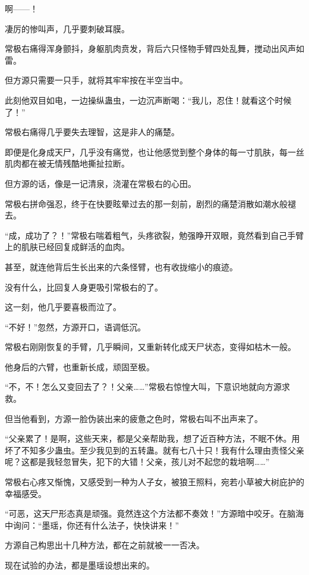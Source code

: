 
\begin{this_body}

啊——！

凄厉的惨叫声，几乎要刺破耳膜。

常极右痛得浑身颤抖，身躯肌肉贲发，背后六只怪物手臂四处乱舞，搅动出风声如雷。

但方源只需要一只手，就将其牢牢按在半空当中。

此刻他双目如电，一边操纵蛊虫，一边沉声断喝：“我儿，忍住！就看这个时候了！”

常极右痛得几乎要失去理智，这是非人的痛楚。

即便是化身成天尸，几乎没有痛觉，也让他感觉到整个身体的每一寸肌肤，每一丝肌肉都在被无情残酷地撕扯拉断。

但方源的话，像是一记清泉，浇灌在常极右的心田。

常极右拼命强忍，终于在快要眩晕过去的那一刻前，剧烈的痛楚消散如潮水般褪去。

“成，成功了？！”常极右喘着粗气，头疼欲裂，勉强睁开双眼，竟然看到自己手臂上的肌肤已经回复成鲜活的血肉。

甚至，就连他背后生长出来的六条怪臂，也有收拢缩小的痕迹。

没有什么，比回复人身更吸引常极右的了。

这一刻，他几乎要喜极而泣了。

“不好！”忽然，方源开口，语调低沉。

常极右刚刚恢复的手臂，几乎瞬间，又重新转化成天尸状态，变得如枯木一般。

他身后的六臂，也重新长成，顽固至极。

“不，不！怎么又变回去了？！父亲……”常极右惊惶大叫，下意识地就向方源求救。

但当他看到，方源一脸伪装出来的疲惫之色时，常极右叫不出声来了。

“父亲累了！是啊，这些天来，都是父亲帮助我，想了近百种方法，不眠不休。用坏了不知多少蛊虫。至少我见到的五转蛊。就有七八十只！我有什么理由责怪父亲呢？这都是我轻忽冒失，犯下的大错！父亲，孩儿对不起您的栽培啊……”

常极右心疼又惭愧，又感受到一种为人子女，被狼王照料，宛若小草被大树庇护的幸福感受。

“可恶，这天尸形态真是顽强。竟然连这个方法都不奏效！”方源暗中咬牙。在脑海中询问：“墨瑶，你还有什么法子，快快讲来！”

方源自己构思出十几种方法，都在之前就被一一否决。

现在试验的办法，都是墨瑶设想出来的。


\end{this_body}
